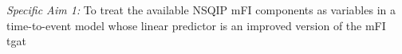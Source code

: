\emph{Specific Aim 1:} To treat the available NSQIP mFI components as variables in a time-to-event model whose linear predictor is an improved version of the mFI tgat 